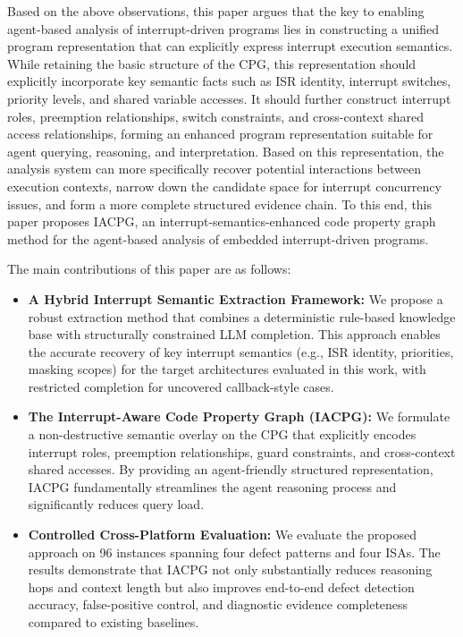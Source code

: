 \documentclass[conference]{IEEEtran}
\begin{document}
Based on the above observations, this paper argues that the key to enabling agent-based analysis of interrupt-driven programs lies in constructing a unified program representation that can explicitly express interrupt execution semantics. While retaining the basic structure of the CPG, this representation should explicitly incorporate key semantic facts such as ISR identity, interrupt switches, priority levels, and shared variable accesses. It should further construct interrupt roles, preemption relationships, switch constraints, and cross-context shared access relationships, forming an enhanced program representation suitable for agent querying, reasoning, and interpretation. Based on this representation, the analysis system can more specifically recover potential interactions between execution contexts, narrow down the candidate space for interrupt concurrency issues, and form a more complete structured evidence chain. To this end, this paper proposes IACPG, an interrupt-semantics-enhanced code property graph method for the agent-based analysis of embedded interrupt-driven programs.


The main contributions of this paper are as follows:
\begin{itemize}
  \item \textbf{A Hybrid Interrupt Semantic Extraction Framework:} We propose a robust extraction method that combines a deterministic rule-based knowledge base with structurally constrained LLM completion. This approach enables the accurate recovery of key interrupt semantics (e.g., ISR identity, priorities, masking scopes) for the target architectures evaluated in this work, with restricted completion for uncovered callback-style cases.
  
  \item \textbf{The Interrupt-Aware Code Property Graph (IACPG):} We formulate a non-destructive semantic overlay on the CPG that explicitly encodes interrupt roles, preemption relationships, guard constraints, and cross-context shared accesses. By providing an agent-friendly structured representation, IACPG fundamentally streamlines the agent reasoning process and significantly reduces query load.
  
  \item \textbf{Controlled Cross-Platform Evaluation:} We evaluate the proposed approach on 96 instances spanning four defect patterns and four ISAs. The results demonstrate that IACPG not only substantially reduces reasoning hops and context length but also improves end-to-end defect detection accuracy, false-positive control, and diagnostic evidence completeness compared to existing baselines.
\end{itemize}
\end{document}

